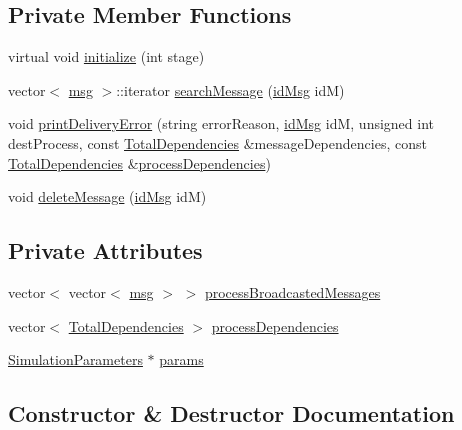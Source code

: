 \subsection*{Private Member Functions}
\begin{DoxyCompactItemize}
\item 
virtual void \hyperlink{classController_aa813a54b625a16ee0c039838b8cdd661}{initialize} (int stage)
\item 
vector$<$ \hyperlink{Controller_8h_afa0f3b802fbc219228f7bb97996fa558}{msg} $>$\+::iterator \hyperlink{classController_aa32d5c18e9e30caf2900527e42b93d44}{search\+Message} (\hyperlink{structures_8h_a83a1d9a070efa5341da84cfd8e28d3e5}{id\+Msg} idM)
\item 
void \hyperlink{classController_ad43f12368786278dd1171226b666395d}{print\+Delivery\+Error} (string error\+Reason, \hyperlink{structures_8h_a83a1d9a070efa5341da84cfd8e28d3e5}{id\+Msg} idM, unsigned int dest\+Process, const \hyperlink{classTotalDependencies}{Total\+Dependencies} \&message\+Dependencies, const \hyperlink{classTotalDependencies}{Total\+Dependencies} \&\hyperlink{classController_ae8234cd96adbdeff4b56a59f6c54df58}{process\+Dependencies})
\item 
void \hyperlink{classController_ab250759d5c511ceb8f35fdf9e42583cd}{delete\+Message} (\hyperlink{structures_8h_a83a1d9a070efa5341da84cfd8e28d3e5}{id\+Msg} idM)
\end{DoxyCompactItemize}
\subsection*{Private Attributes}
\begin{DoxyCompactItemize}
\item 
vector$<$ vector$<$ \hyperlink{Controller_8h_afa0f3b802fbc219228f7bb97996fa558}{msg} $>$ $>$ \hyperlink{classController_ae96146dee6f60ecd94bfe40b9fc658ad}{process\+Broadcasted\+Messages}
\item 
vector$<$ \hyperlink{classTotalDependencies}{Total\+Dependencies} $>$ \hyperlink{classController_ae8234cd96adbdeff4b56a59f6c54df58}{process\+Dependencies}
\item 
\hyperlink{classSimulationParameters}{Simulation\+Parameters} $\ast$ \hyperlink{classController_a81d7fe43b78ef7601e6b36c3df38ce79}{params}
\end{DoxyCompactItemize}


\subsection{Constructor \& Destructor Documentation}
\mbox{\label{classController_a95c56822d667e94b031451729ce069a9}} 
